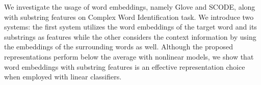 We investigate the usage of word embeddings, namely Glove and SCODE, along with substring features on Complex Word Identification task. We introduce two systems: the first system utilizes the word embeddings of the target word and its substrings as features while the other considers the context information by using the embeddings of the surrounding words as well. Although the proposed representations perform below the average with nonlinear models, we show that word embeddings with substring features is an effective representation choice when employed with linear classifiers.
